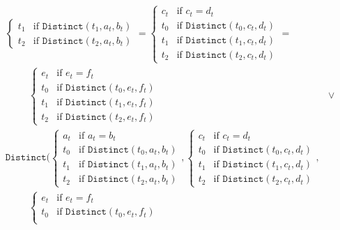 \documentclass[12pt]{scrartcl}
\newcommand{\mtt}[1]{\ensuremath{\mathtt{#1}}}
\begin{document}
\begin{align*}
\begin{array}{ll}
\begin{cases}
                t_1 & \text{if } \mtt{Distinct}(t_1, a_t, b_t) \\
                t_2 & \text{if } \mtt{Distinct}(t_2, a_t, b_t)
            \end{cases} = \begin{cases}
                c_t & \text{if } c_t = d_t \\
                t_0 & \text{if } \mtt{Distinct}(t_0, c_t, d_t) \\
                t_1 & \text{if } \mtt{Distinct}(t_1, c_t, d_t) \\
                t_2 & \text{if } \mtt{Distinct}(t_2, c_t, d_t)
            \end{cases} =&\\ \hspace{1cm}\begin{cases}
                e_t & \text{if } e_t = f_t \\
                t_0 & \text{if } \mtt{Distinct}(t_0, e_t, f_t) \\
                t_1 & \text{if } \mtt{Distinct}(t_1, e_t, f_t) \\
                t_2 & \text{if } \mtt{Distinct}(t_2, e_t, f_t)
            \end{cases} &\vee\\
            \mtt{Distinct}(\begin{cases}
                a_t & \text{if } a_t = b_t \\
                t_0 & \text{if } \mtt{Distinct}(t_0, a_t, b_t) \\
                t_1 & \text{if } \mtt{Distinct}(t_1, a_t, b_t) \\
                t_2 & \text{if } \mtt{Distinct}(t_2, a_t, b_t)
            \end{cases}, \begin{cases}
                c_t & \text{if } c_t = d_t \\
                t_0 & \text{if } \mtt{Distinct}(t_0, c_t, d_t) \\
                t_1 & \text{if } \mtt{Distinct}(t_1, c_t, d_t) \\
                t_2 & \text{if } \mtt{Distinct}(t_2, c_t, d_t)
            \end{cases},&\\\hspace{1cm} \begin{cases}
                e_t & \text{if } e_t = f_t \\
                t_0 & \text{if } \mtt{Distinct}(t_0, e_t, f_t) \\

\end{cases}
\end{array}
\end{align*}
\end{document}
